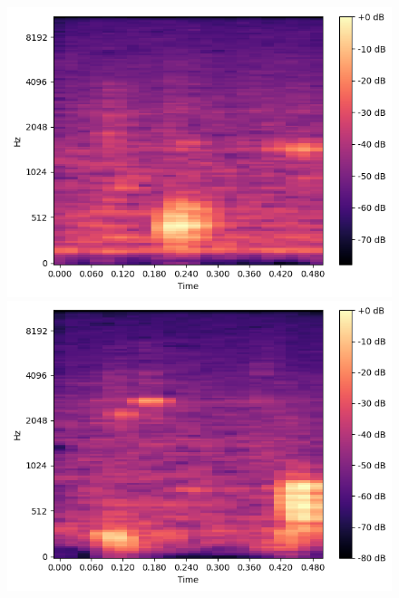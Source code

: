 \begin{figure}[t]
\begin{minipage}[b]{0.16\hsize}
        \includegraphics[width=\hsize]{img/melspec/cream-filled-roll.png}
    \end{minipage}
    \begin{minipage}[b]{0.16\hsize}
        \centering
        \includegraphics[width=\hsize]{img/melspec/yakisoba.png}
    \end{minipage}
    \begin{minipage}[b]{0.16\hsize}
        \centering

\end{minipage}
\end{figure}
